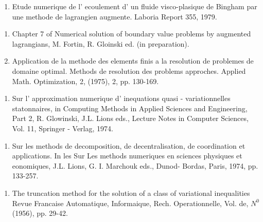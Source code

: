 \begin{thebibliography}{99}
\begin{enumerate}
  \item Etude numerique de l' ecoulement d' un fluide visco-plasique
 de Bingham par une methode de lagrangien augmente. Laboria Report
 355, 1979.\label{k6:e2} 
  \end{enumerate}


  \begin{enumerate}
  \item  Chapter 7 of Numerical solution of boundary value problems by
 augmented lagrangians, M. Fortin, R. Gloinski ed. (in
 preparation).\label{k7:e1}
 
  \item  Application de la methode des elements finis a la resolution de
  problemes de domaine optimal. Methods de resolution des problems
  approches. Applied Math. Optimization, 2, (1975), 2, pp. 130-169.\label{k7:e2} 
  \end{enumerate}


  \begin{enumerate}
  \item Sur l' approximation numerique d' inequations quasi -
 variationnelles statonnaires, in Computing Methods in Applied
 Sciences and Engineering, Part 2, R. Glowinski, J.L. Lions eds.,
 Lecture Notes in Computer Sciences, Vol. 11, Springer - Verlag,
 1974.\label{k8:e1}
  \end{enumerate}


  \begin{enumerate}
  \item Sur les methods de decomposition, de decentralisation, de
 coordination et applications. In les Sur Les methods numeriques en
 sciences physiques et eonomiques, J.L. Lions, G. I. Marchouk eds.,
 Dunod- Bordas, Paris, 1974, pp. 133-257.\label{k9:e1} 
  \end{enumerate}


  \begin{enumerate}
  \item The truncation method for the solution of a class of
 variational inequalities Revue Francaise Automatique, Informaique,
 Rech. Operationnelle, Vol. de, $N^0$ (1956), pp. 29-42.\label{k10:e1} 
  \end{enumerate}


\end{thebibliography}
